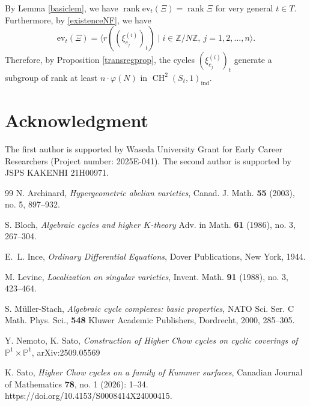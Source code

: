 \documentclass[letterpaper, 11pt]{amsart}
\theoremstyle{my theoremstyle}
\theoremstyle{dfn}
\theoremstyle{remark}
\renewcommand{\1}{\mathbbm{1}}
\newcommand{\Z}{\mathbb{Z}}
\newcommand{\ch}{\operatorname{CH}}
\numberwithin{equation}{section}
\begin{document}
By Lemma \ref{basiclem}, we have $\operatorname{rank} \mathrm{ev}_t(\Xi) = \operatorname{rank} \Xi$ for very general $t\in T$.
Furthermore, by \eqref{existenceNF}, we have
\begin{equation*}
\mathrm{ev}_t(\Xi) = \langle r((\xi_{c_j}^{(i)})_t)\mid i\in \Z/N\Z,\ j=1,2,\dots, n\rangle.
\end{equation*}
Therefore, by Proposition \ref{transregprop}, the cycles $(\xi_{c_j}^{(i)})_t$ generate a subgroup of rank at least $n \cdot \varphi(N)$ in $\ch^2(S_t,1)_{\mathrm{ind}}$.


\section*{Acknowledgment}
The first author is supported by Waseda University Grant for Early Career Researchers (Project number: 2025E-041). 
The second author is supported by JSPS KAKENHI 21H00971.


\begin{thebibliography}{99}
N. Archinard, 
\textit{Hypergeometric abelian varieties}, 
Canad. J. Math. \textbf{55} (2003), no. 5, 897--932.

S. Bloch, 
\textit{Algebraic cycles and higher $K$-theory}
Adv. in Math. \textbf{61} (1986), no. 3, 267--304.

E.~L. Ince, 
{\it Ordinary Differential Equations}, Dover Publications, New York, 1944.

M. Levine, 
\textit{Localization on singular varieties}, 
Invent. Math. \textbf{91} (1988), no. 3, 423--464.


S. M\"uller-Stach, 
\textit{Algebraic cycle complexes: basic properties}, 
NATO Sci. Ser. C Math. Phys. Sci., \textbf{548}
Kluwer Academic Publishers, Dordrecht, 2000, 285--305.


Y. Nemoto, K. Sato, 
\textit{Construction of Higher Chow cycles on cyclic coverings of $\mathbb{P}^1 \times \mathbb{P}^1$}, 
arXiv:2509.05569




K. Sato,  
\textit{Higher Chow cycles on a family of Kummer surfaces}, 
Canadian Journal of Mathematics {\bf 78}, no. 1 (2026): 1–34. https://doi.org/10.4153/S0008414X24000415.


\end{thebibliography}
\end{document}
